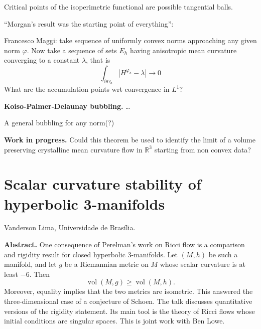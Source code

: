 \begin{theorem}
\label{theorem-dm17}
Critical points of the isoperimetric
functional are possible tangential balls.
\end{theorem}

\begin{theorem}
\label{theorem-drks}
\end{theorem}

\noindent
``Morgan's result was the starting point
of everything'':

\begin{theorem}[Morgan, 2005]
\label{theorem-morgan}

\end{theorem}

\medskip\noindent
Francesco Maggi: take sequence of uniformly
convex norms approaching any given norm
$\varphi$.
Now take a sequence of sets $E_h$
having anisotropic mean curvature converging
to a constant $\lambda$, that is
$$
\int_{\partial
\Omega_h}|H^{\varphi_h}-\lambda|\to 0
$$
What are the accumulation points wrt
convergence in $L^1$?


\medskip\noindent
{\bf Koiso-Palmer-Delaunay bubbling.}
…

\begin{theorem}[S, 2026]
\label{theorem-s26}
A general bubbling for any norm(?)
\end{theorem}

\medskip\noindent
{\bf Work in progress.}
Could this theorem be used to identify the
limit of a volume preserving crystalline
mean curvature flow in $\mathbb{R}^3$
starting from non convex data?




\section{Scalar curvature stability of
hyperbolic 3-manifolds}
\label{section-scalar-curvature-stability}

\medskip\noindent
Vanderson Lima,
Universidade de Bras\'ilia.

\medskip\noindent
{\bf Abstract.}
One consequence of Perelman's work on
Ricci flow is a comparison and rigidity
result for closed hyperbolic
$3$-manifolds. Let $(M,h)$ be such a
manifold, and let $g$ be a Riemannian
metric on $M$ whose scalar curvature is
at least $-6$. Then
$$
\operatorname{vol}(M,g)
\geq \operatorname{vol}(M,h).
$$
Moreover, equality implies that the two
metrics are isometric. This answered the
three-dimensional case of a conjecture of
Schoen. The talk discusses quantitative
versions of the rigidity statement. Its
main tool is the theory of Ricci flows
whose initial conditions are singular
spaces. This is joint work with Ben Lowe.

